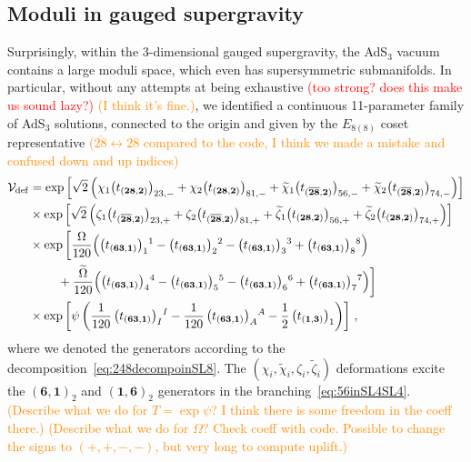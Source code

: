 \documentclass[a4paper, 11pt]{article}
\numberwithin{equation}{section}
\newcommand{\ts}[1]{\widetilde{#1}}
\newcommand{\ov}[1]{\overline{#1}}
\newcommand{\EE}{\ensuremath{E_{8(8)}}\xspace}
\newcommand{\+}{\oplus}
\newcommand{\fl}[1]{\ov{#1}}
\newcommand{\EM}[1]{\textcolor{red}{#1}}
\newcommand{\CE}[1]{\textcolor{darkorange}{#1}}
\begin{document}
\subsection{Moduli in gauged supergravity}
Surprisingly, within the 3-dimensional gauged supergravity, the AdS$_3$ vacuum contains a large moduli space, which even has supersymmetric submanifolds. In particular, without any attempts at being exhaustive \EM{(too strong? does this make us sound lazy?)} \CE{(I think it's fine.)}, we identified a continuous 11-parameter family of AdS$_3$ solutions, connected to the origin and given by the \EE coset representative \CE{($\fl{28}\leftrightarrow28$ compared to the code, I think we made a mistake and confused down and up indices)}
\begin{equation} \label{eq:FullDeformation}
	\begin{split}
		{\cal V}_{\rm def} &= \exp\left[\sqrt{2}\left(\chi_{1}\big(t_{(\mathbf{28},\mathbf{2})}\big)_{23,-}+\chi_{2}\big(t_{(\mathbf{28},\mathbf{2})}\big)_{81,-}+\ts{\chi}_{1}\big(t_{(\mathbf{\fl{28}},\mathbf{2})}\big)_{56,-}+\ts{\chi}_{2}\big(t_{(\mathbf{\fl{28}},\mathbf{2})}\big)_{74,-}\right)\right] \\
		& \times \exp\left[\sqrt{2}\left(\zeta_{1}\big(t_{(\mathbf{\fl{28}},\mathbf{2})}\big)_{23,+}+\zeta_{2}\big(t_{(\mathbf{\fl{28}},\mathbf{2})}\big)_{81,+}+\ts{\zeta}_{1}\big(t_{(\mathbf{28},\mathbf{2})}\big)_{56,+}+\ts{\zeta}_{2}\big(t_{(\mathbf{28},\mathbf{2})}\big)_{74,+}\right)\right] \\
		& \times \exp\bigg[\frac{\Omega}{120}\Big(\big(t_{(\mathbf{63},\mathbf{1})}\big)_{1}{}^{1}-\big(t_{(\mathbf{63},\mathbf{1})}\big)_{2}{}^{2}-\big(t_{(\mathbf{63},\mathbf{1})}\big)_{3}{}^{3}+\big(t_{(\mathbf{63},\mathbf{1})}\big)_{8}{}^{8}\Big)\\
		&\ \qquad+\frac{\ts{\Omega}}{120}\Big(\big(t_{(\mathbf{63},\mathbf{1})}\big)_{4}{}^{4}-\big(t_{(\mathbf{63},\mathbf{1})}\big)_{5}{}^{5}-\big(t_{(\mathbf{63},\mathbf{1})}\big)_{6}{}^{6}+\big(t_{(\mathbf{63},\mathbf{1})}\big)_{7}{}^{7}\Big)\bigg] \\
		& \times \exp\left[\psi\left(\frac{1}{120}\,\big(t_{(\mathbf{63},\mathbf{1})}\big)_{I}{}^{I}-\frac{1}{120}\,\big(t_{(\mathbf{63},\mathbf{1})}\big)_{A}{}^{A}-\frac{1}{2}\,\big(t_{(\mathbf{1},\mathbf{3})}\big)_{1}\right)\right]\,,
	\end{split}
\end{equation}
where we denoted the generators according to the decomposition~\eqref{eq:248decompoinSL8}. The $(\chi_{i},\ts{\chi}_{i},\zeta_{i},\ts{\zeta}_{i})$ deformations excite the $(\mathbf{6},\mathbf{1})_{2}$ and $(\mathbf{1},\mathbf{6})_{2}$ generators in the branching~\eqref{eq:56inSL4SL4}. \CE{(Describe what we do for $T = \exp{\psi}$? I think there is some freedom in the coeff there.)} \CE{(Describe what we do for $\Omega$? Check coeff with code. Possible to change the signs to $(+,+,-,-)$, but very long to compute uplift.)}
\end{document}
